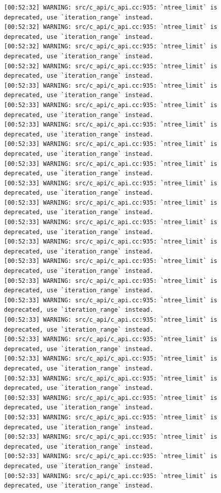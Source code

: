 \documentclass[
  letterpaper,
  DIV=11,
  numbers=noendperiod]{scrartcl}
\begin{document}
\begin{verbatim}
[00:52:32] WARNING: src/c_api/c_api.cc:935: `ntree_limit` is deprecated, use `iteration_range` instead.
[00:52:32] WARNING: src/c_api/c_api.cc:935: `ntree_limit` is deprecated, use `iteration_range` instead.
[00:52:32] WARNING: src/c_api/c_api.cc:935: `ntree_limit` is deprecated, use `iteration_range` instead.
[00:52:32] WARNING: src/c_api/c_api.cc:935: `ntree_limit` is deprecated, use `iteration_range` instead.
[00:52:33] WARNING: src/c_api/c_api.cc:935: `ntree_limit` is deprecated, use `iteration_range` instead.
[00:52:33] WARNING: src/c_api/c_api.cc:935: `ntree_limit` is deprecated, use `iteration_range` instead.
[00:52:33] WARNING: src/c_api/c_api.cc:935: `ntree_limit` is deprecated, use `iteration_range` instead.
[00:52:33] WARNING: src/c_api/c_api.cc:935: `ntree_limit` is deprecated, use `iteration_range` instead.
[00:52:33] WARNING: src/c_api/c_api.cc:935: `ntree_limit` is deprecated, use `iteration_range` instead.
[00:52:33] WARNING: src/c_api/c_api.cc:935: `ntree_limit` is deprecated, use `iteration_range` instead.
[00:52:33] WARNING: src/c_api/c_api.cc:935: `ntree_limit` is deprecated, use `iteration_range` instead.
[00:52:33] WARNING: src/c_api/c_api.cc:935: `ntree_limit` is deprecated, use `iteration_range` instead.
[00:52:33] WARNING: src/c_api/c_api.cc:935: `ntree_limit` is deprecated, use `iteration_range` instead.
[00:52:33] WARNING: src/c_api/c_api.cc:935: `ntree_limit` is deprecated, use `iteration_range` instead.
[00:52:33] WARNING: src/c_api/c_api.cc:935: `ntree_limit` is deprecated, use `iteration_range` instead.
[00:52:33] WARNING: src/c_api/c_api.cc:935: `ntree_limit` is deprecated, use `iteration_range` instead.
[00:52:33] WARNING: src/c_api/c_api.cc:935: `ntree_limit` is deprecated, use `iteration_range` instead.
[00:52:33] WARNING: src/c_api/c_api.cc:935: `ntree_limit` is deprecated, use `iteration_range` instead.
[00:52:33] WARNING: src/c_api/c_api.cc:935: `ntree_limit` is deprecated, use `iteration_range` instead.
[00:52:33] WARNING: src/c_api/c_api.cc:935: `ntree_limit` is deprecated, use `iteration_range` instead.
[00:52:33] WARNING: src/c_api/c_api.cc:935: `ntree_limit` is deprecated, use `iteration_range` instead.
[00:52:33] WARNING: src/c_api/c_api.cc:935: `ntree_limit` is deprecated, use `iteration_range` instead.
[00:52:33] WARNING: src/c_api/c_api.cc:935: `ntree_limit` is deprecated, use `iteration_range` instead.
[00:52:33] WARNING: src/c_api/c_api.cc:935: `ntree_limit` is deprecated, use `iteration_range` instead.
[00:52:33] WARNING: src/c_api/c_api.cc:935: `ntree_limit` is deprecated, use `iteration_range` instead.

\end{verbatim}
\end{document}
